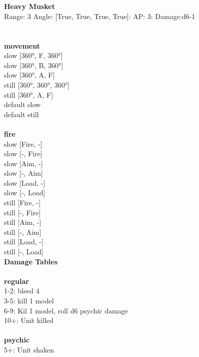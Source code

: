 \ \\

\ \\
{\bf Heavy Musket } \\



Range: 3  Angle: [True, True, True, True]: AP: 3: Damage:d6-1 \\




 
\ \\



\ \\ {\bf movement } \\
slow [360°, F, 360°] \\
slow [360°, B, 360°] \\
slow [360°, A, F] \\
still [360°, 360°, 360°] \\
still [360°, A, F] \\
default slow \\
default still \\
\ \\ {\bf fire } \\
slow [Fire, -] \\
slow [-, Fire] \\
slow [Aim, -] \\
slow [-, Aim] \\
slow [Load, -] \\
slow [-, Load] \\
still [Fire, -] \\
still [-, Fire] \\
still [Aim, -] \\
still [-, Aim] \\
still [Load, -] \\
still [-, Load] \\


{\bf Damage Tables} \\
\ \\ {\bf regular } \\
1-2: bleed 4 \\
3-5: kill 1 model \\
6-9: Kil 1 model, roll d6 psychic damage \\
10+: Unit killed \\
\ \\ {\bf psychic } \\
5+: Unit shaken \\










